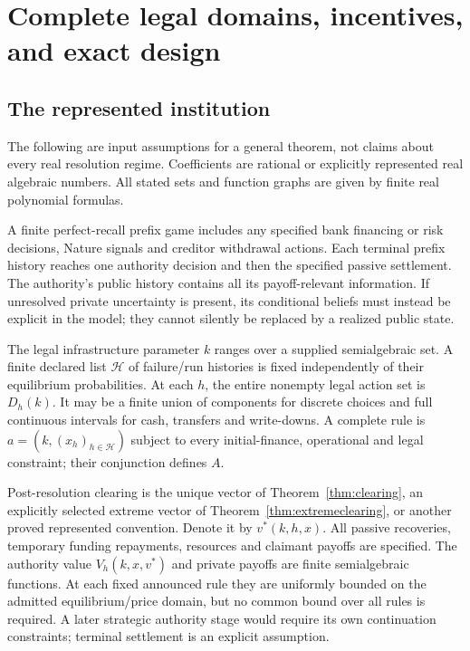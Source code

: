 \documentclass[11pt,a4paper]{article}
\numberwithin{equation}{section}
\theoremstyle{definition}
\begin{document}
\section{Complete legal domains, incentives, and exact design}\label{sec:general}

\subsection{The represented institution}
The following are input assumptions for a general theorem, not claims
about every real resolution regime. Coefficients are rational or explicitly
represented real algebraic numbers. All stated sets and function graphs
are given by finite real polynomial formulas.

A finite perfect-recall prefix game includes any specified bank financing
or risk decisions, Nature signals and creditor withdrawal actions. Each
terminal prefix history reaches one authority decision and then the
specified passive settlement. The authority's public history contains all
its payoff-relevant information. If unresolved private uncertainty is
present, its conditional beliefs must instead be explicit in the model;
they cannot silently be replaced by a realized public state.

The legal infrastructure parameter \(k\) ranges over a supplied
semialgebraic set. A finite declared list \(\mathcal H\) of failure/run
histories is fixed independently of their equilibrium probabilities.
At each \(h\), the entire nonempty legal action set is \(D_h(k)\).
It may be a finite union of components for discrete choices and full
continuous intervals for cash, transfers and write-downs. A complete rule
is \(a=(k,(x_h)_{h\in\mathcal H})\) subject to every initial-finance,
operational and legal constraint; their conjunction defines \(A\).

Post-resolution clearing is the unique vector of
Theorem~\ref{thm:clearing}, an explicitly selected extreme vector of
Theorem~\ref{thm:extremeclearing}, or another proved represented convention.
Denote it by \(v^*(k,h,x)\). All passive recoveries, temporary funding
repayments, resources and claimant payoffs are specified. The authority
value \(V_h(k,x,v^*)\) and private payoffs are finite semialgebraic
functions. At each fixed announced rule they are uniformly bounded on the
admitted equilibrium/price domain, but no common bound over all rules
is required. A later strategic authority stage would require its own
continuation constraints; terminal settlement is an explicit assumption.
\end{document}
